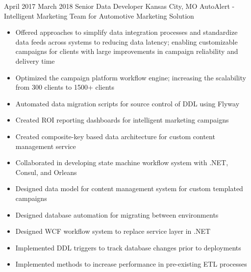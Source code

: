 \ProjectExperience
{April 2017}
{March 2018}
{Senior Data Developer}
{Kansas City, MO}
{AutoAlert - Intelligent Marketing Team for Automotive Marketing Solution}
{
    \begin{itemize}
        \item Offered approaches to simplify data integration processes and
        standardize data feeds across systems to reducing data latency; enabling
        customizable campaigns for clients with large improvements in campaign
        reliability and delivery time
        \item Optimized the campaign platform workflow engine; increasing the
        scalability from 300 clients to 1500+ clients
        \item Automated data migration scripts for source control of DDL using
        Flyway
        \item Created ROI reporting dashboards for intelligent marketing
        campaigns
        \item Created composite-key based data architecture for custom content
        management service
    \end{itemize}
}
{
    \begin{itemize}
        \item Collaborated in developing state machine workflow system with
        .NET, Consul, and Orleans
        \item Designed data model for content management system for custom
        templated campaigns
        \item Designed database automation for migrating between environments
        \item Designed WCF workflow system to replace service layer in .NET
    \end{itemize}
}
{
    \begin{itemize}
        \item Implemented DDL triggers to track database changes prior to
        deployments
        \item Implemented methods to increase performance in pre-existing ETL
        processes
    \end{itemize}
}

